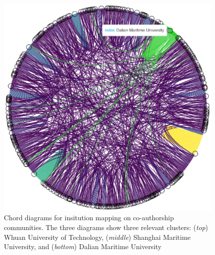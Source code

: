 \documentclass[a4paper, review, endfloat, authoryear]{elsarticle}
\begin{document}
\begin{figure}[htbp]
		\includegraphics[height=0.3\textheight, keepaspectratio]{pics/coauthorship_inst_chord_3.eps}
		\caption{Chord diagrams for insitution mapping on co-authorship communities. The three diagrams show three relevant clusters: (\textit{top}) Whuan University of Technology, (\textit{middle}) Shanghai Maritime University, and (\textit{bottom}) Dalian Maritime University}\label{fig:fig6}
	\end{figure}
\end{document}
